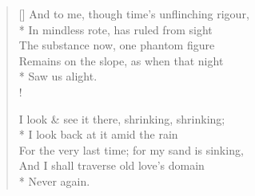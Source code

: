 \documentclass[MAIN]{subfiles}
\begin{document}
\begin{verse}[\versewidth]
And to me, though time's unflinching rigour,\\*
\vin In mindless rote, has ruled from sight\\
The substance now, one phantom figure\\
\vin Remains on the slope, as when that night\\*
\vin \vin Saw us alight.\\!

I look \& see it there, shrinking, shrinking;\\*
\vin I look back at it amid the rain\\
For the very last time; for my sand is sinking,\\
\vin And I shall traverse old love's domain\\*
\vin \vin Never again.
\end{verse}
\end{document}
